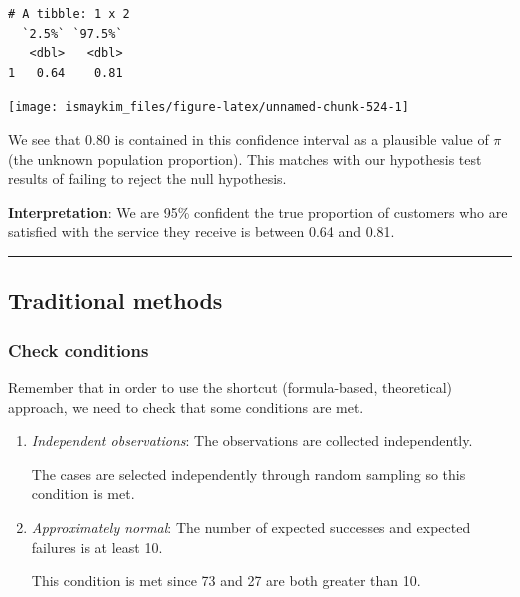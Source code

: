 \documentclass[12pt, krantz2,]{krantz}
\makeatletter
\newenvironment{Shaded}{\begin{snugshade}}{\end{snugshade}}
\newcommand{\DataTypeTok}[1]{\textcolor[rgb]{0.27,0.27,0.27}{#1}}
\newcommand{\KeywordTok}[1]{\textcolor[rgb]{0.27,0.27,0.27}{\textbf{#1}}}
\newcommand{\NormalTok}[1]{#1}
\newcommand{\OperatorTok}[1]{\textcolor[rgb]{0.43,0.43,0.43}{\textbf{#1}}}
\newcommand{\StringTok}[1]{\textcolor[rgb]{0.5,0.5,0.5}{#1}}
\newenvironment{kframe}{%
\medskip{}
\setlength{\fboxsep}{.8em}
 \def\at@end@of@kframe{}%
 \ifinner\ifhmode%
  \def\at@end@of@kframe{\end{minipage}}%
  \begin{minipage}{\columnwidth}%
 \fi\fi%
 \def\FrameCommand##1{\hskip\@totalleftmargin \hskip-\fboxsep
 \colorbox{shadecolor}{##1}\hskip-\fboxsep
     \hskip-\linewidth \hskip-\@totalleftmargin \hskip\columnwidth}%
 \MakeFramed {\advance\hsize-\width
   \@totalleftmargin\z@ \linewidth\hsize
   \@setminipage}}%
 {\par\unskip\endMakeFramed%
 \at@end@of@kframe}
\renewenvironment{Shaded}{\begin{kframe}}{\end{kframe}}
\makeatother
\begin{document}
\begin{verbatim}
# A tibble: 1 x 2
  `2.5%` `97.5%`
   <dbl>   <dbl>
1   0.64    0.81
\end{verbatim}

\begin{Shaded}
\end{Shaded}

\begin{center}\texttt{[image: ismaykim\_files/figure-latex/unnamed-chunk-524-1]} \end{center}

We see that 0.80 is contained in this confidence interval as a plausible value of \(\pi\) (the unknown population proportion). This matches with our hypothesis test results of failing to reject the null hypothesis.

\textbf{Interpretation}: We are 95\% confident the true proportion of customers who are satisfied with the service they receive is between 0.64 and 0.81.

\begin{center}\rule{0.5\linewidth}{\linethickness}\end{center}

\hypertarget{traditional-methods-1}{%
\subsection{Traditional methods}\label{traditional-methods-1}}

\hypertarget{check-conditions-1}{%
\subsubsection*{Check conditions}\label{check-conditions-1}}


Remember that in order to use the shortcut (formula-based, theoretical) approach, we need to check that some conditions are met.

\begin{enumerate}
\def\labelenumi{\arabic{enumi}.}
\item
  \emph{Independent observations}: The observations are collected independently.

  The cases are selected independently through random sampling so this condition is met.
\item
  \emph{Approximately normal}: The number of expected successes and expected failures is at least 10.

  This condition is met since 73 and 27 are both greater than 10.
\end{enumerate}
\end{document}

